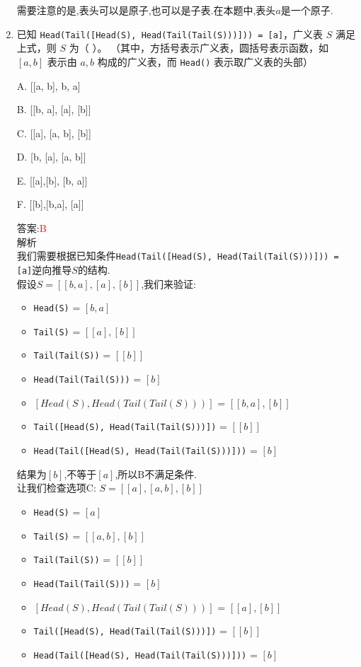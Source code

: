 \documentclass[lang=cn,newtx,10pt,scheme=chinese]{../elegantbook}
\begin{document}
\begin{enumerate}
    需要注意的是,表头可以是原子,也可以是子表.在本题中,表头$a$是一个原子.\\

    \item 已知 \texttt{Head(Tail([Head(S), Head(Tail(Tail(S)))])) = [a]}，广义表 $S$ 满足上式，则 $S$ 为（ ）。  
    （其中，方括号表示广义表，圆括号表示函数，如 $[a, b]$ 表示由 $a, b$ 构成的广义表，而 \texttt{Head()} 表示取广义表的头部）  

    A. [[a, b], b, a]  

    B. [[b, a], [a], [b]]  

    C. [[a], [a, b], [b]]  

    D. [b, [a], [a, b]]  

    E. [[a],[b], [b, a]]  

    F. [[b],[b,a], [a]]

    答案:\textcolor{red}{B}\\
    解析\\
    我们需要根据已知条件\texttt{Head(Tail([Head(S), Head(Tail(Tail(S)))])) = [a]}逆向推导$S$的结构.\\
    
    假设$S = [[b, a], [a], [b]]$,我们来验证:
    \begin{itemize}
        \item \texttt{Head(S)} = $[b, a]$
        \item \texttt{Tail(S)} = $[[a], [b]]$
        \item \texttt{Tail(Tail(S))} = $[[b]]$
        \item \texttt{Head(Tail(Tail(S)))} = $[b]$
        \item $[Head(S), Head(Tail(Tail(S)))]$ = $[[b, a], [b]]$
        \item \texttt{Tail([Head(S), Head(Tail(Tail(S)))])} = $[[b]]$
        \item \texttt{Head(Tail([Head(S), Head(Tail(Tail(S)))]))} = $[b]$
    \end{itemize}
    
    结果为$[b]$,不等于$[a]$,所以B不满足条件.\\
    
    让我们检查选项C: $S = [[a], [a, b], [b]]$
    \begin{itemize}
        \item \texttt{Head(S)} = $[a]$
        \item \texttt{Tail(S)} = $[[a, b], [b]]$
        \item \texttt{Tail(Tail(S))} = $[[b]]$
        \item \texttt{Head(Tail(Tail(S)))} = $[b]$
        \item $[Head(S), Head(Tail(Tail(S)))]$ = $[[a], [b]]$
        \item \texttt{Tail([Head(S), Head(Tail(Tail(S)))])} = $[[b]]$
        \item \texttt{Head(Tail([Head(S), Head(Tail(Tail(S)))]))} = $[b]$
    \end{itemize}
    

\end{enumerate}
\end{document}

